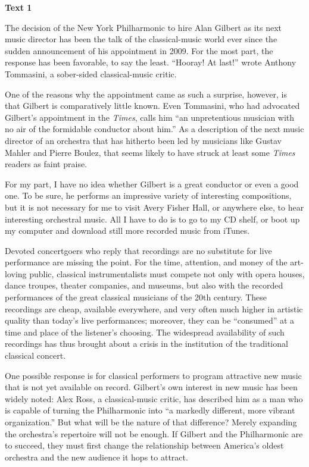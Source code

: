 
\begin{center}\textbf{Text 1}\end{center}

\qquad The decision of the New York Philharmonic to hire Alan Gilbert as its next music director has been the talk of the classical-music world ever since the sudden announcement of his appointment in 2009. For the most part, the response has been favorable, to say the least. ``Hooray! At last!'' wrote Anthony Tommasini, a sober-sided classical-music critic. 

\qquad One of the reasons why the appointment came as such a surprise, however, is that Gilbert is comparatively little known. Even Tommasini, who had advocated Gilbert's appointment in the \emph{Times}, calls him ``an unpretentious musician with no air of the formidable conductor about him.'' As a description of the next music director of an orchestra that has hitherto been led by musicians like Gustav Mahler and Pierre Boulez, that seems likely to have struck at least some \emph{Times} readers as faint praise.

\qquad For my part, I have no idea whether Gilbert is a great conductor or even a good one. To be sure, he performs an impressive variety of interesting compositions, but it is not necessary for me to visit Avery Fisher Hall, or anywhere else, to hear interesting orchestral music. All I have to do is to go to my CD shelf, or boot up my computer and download still more recorded music from iTunes.

\qquad Devoted concertgoers who reply that recordings are no substitute for live performance are missing the point. For the time, attention, and money of the art-loving public, classical instrumentalists must compete not only with opera houses, dance troupes, theater companies, and museums, but also with the recorded performances of the great classical musicians of the 20th century. These recordings are cheap, available everywhere, and very often much higher in artistic quality than today's live performances; moreover, they can be ``consumed'' at a time and place of the listener's choosing. The widespread availability of such recordings has thus brought about a crisis in the institution of the traditional classical concert.

\qquad One possible response is for classical performers to program attractive new music that is not yet available on record. Gilbert's own interest in new music has been widely noted: Alex Ross, a classical-music critic, has described him as a man who is capable of turning the Philharmonic into ``a markedly different, more vibrant organization.'' But what will be the nature of that difference? Merely expanding the orchestra's repertoire will not be enough. If Gilbert and the Philharmonic are to succeed, they must first change the relationship between America's oldest orchestra and the new audience it hops to attract.


